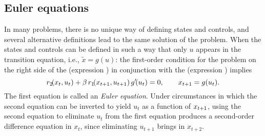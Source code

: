 \subsection{Euler equations}
In many problems, there is no unique way of defining states and controls, and
several alternative definitions lead to the same solution of the problem.
When the states and controls can be defined in such a way that
only $u$ appears in the transition equation, i.e., $\tilde x = g(u)$:
the first-order condition for the problem on the right
side of the  (expression )
in conjunction with the 
(expression ) implies
$$r_2\!(x_t,u_t)+{\beta} \, r_1\!(x_{t+1},u_{t+1}) \, g'\!(u_t) =0, \qquad x_{{t+1}}
=g(u_t).$$
The first equation is called an {\it Euler equation}.
  Under
circumstances in which the second equation can be inverted to yield $u_t$ as a
function of $x_{{t+1}}$, using the second equation to eliminate $u_t$ from the
first equation produces a second-order difference equation in $x_t$, since
eliminating $u_{t+1}$ brings in $x_{t+2}$.


